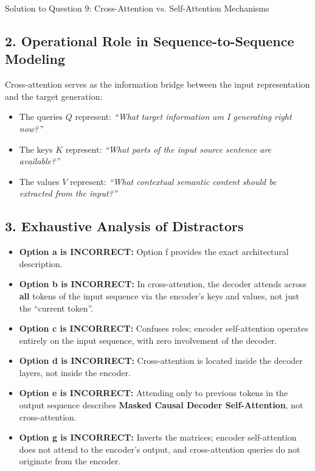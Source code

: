 \documentclass[11pt,a4paper]{article}
\begin{document}
\begin{solutionbox}{Solution to Question 9: Cross-Attention vs. Self-Attention Mechanisms}
\subsection*{2. Operational Role in Sequence-to-Sequence Modeling}
Cross-attention serves as the information bridge between the input representation and the target generation:
\begin{itemize}[leftmargin=1.5em,itemsep=1pt]
    \item The queries $Q$ represent: \textit{``What target information am I generating right now?''}
    \item The keys $K$ represent: \textit{``What parts of the input source sentence are available?''}
    \item The values $V$ represent: \textit{``What contextual semantic content should be extracted from the input?''}
\end{itemize}

\subsection*{3. Exhaustive Analysis of Distractors}
\begin{itemize}[leftmargin=1.5em,itemsep=2pt]
    \item \textbf{Option a is INCORRECT:} Option f provides the exact architectural description.
    \item \textbf{Option b is INCORRECT:} In cross-attention, the decoder attends across \textbf{all} tokens of the input sequence via the encoder's keys and values, not just the ``current token''.
    \item \textbf{Option c is INCORRECT:} Confuses roles; encoder self-attention operates entirely on the input sequence, with zero involvement of the decoder.
    \item \textbf{Option d is INCORRECT:} Cross-attention is located inside the decoder layers, not inside the encoder.
    \item \textbf{Option e is INCORRECT:} Attending only to previous tokens in the output sequence describes \textbf{Masked Causal Decoder Self-Attention}, not cross-attention.
    \item \textbf{Option g is INCORRECT:} Inverts the matrices; encoder self-attention does not attend to the encoder's output, and cross-attention queries do not originate from the encoder.
\end{itemize}
\end{solutionbox}

\vspace{0.4cm}
\end{document}
